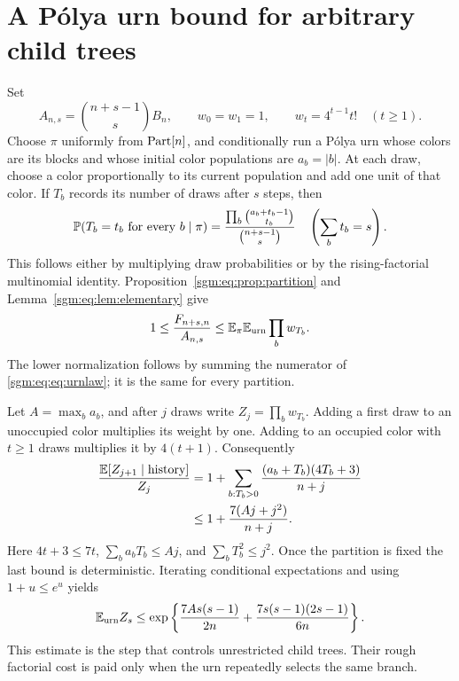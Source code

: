 \documentclass[11pt,letterpaper]{article}
\theoremstyle{remark}\newtheorem{remark}[theorem]{Remark}
\theoremstyle{definition}\newtheorem{definition}[theorem]{Definition}
\begin{document}
\section{A P\'olya urn bound for arbitrary child trees}\label{sgm:eq:sec:urn}
Set
\[
 A_{n,s}=\binom{n+s-1}{s}B_n,
 \qquad w_0=w_1=1,\qquad w_t=4^{t-1}t!\quad(t\ge1).
\]
Choose $\pi$ uniformly from $\operatorname{Part}[n]$, and conditionally run a P\'olya urn whose colors are its blocks and whose initial color populations are $a_b=|b|$. At each draw, choose a color proportionally to its current population and add one unit of that color. If $T_b$ records its number of draws after $s$ steps, then
\begin{equation}\label{sgm:eq:eq:urnlaw}
 \mathbb P(T_b=t_b\text{ for every }b\mid\pi)
 =\frac{\prod_b\binom{a_b+t_b-1}{t_b}}{\binom{n+s-1}{s}}
 \quad\left(\sum_b t_b=s\right).
\end{equation}
This follows either by multiplying draw probabilities or by the rising-factorial multinomial identity. Proposition~\ref{sgm:eq:prop:partition} and Lemma~\ref{sgm:eq:lem:elementary} give
\begin{equation}\label{sgm:eq:eq:urndom}
 1\le\frac{F_{n+s,n}}{A_{n,s}}
 \le\mathbb E_\pi\mathbb E_{\mathrm{urn}}\prod_b w_{T_b}.
\end{equation}
The lower normalization follows by summing the numerator of \eqref{sgm:eq:eq:urnlaw}; it is the same for every partition.

Let $A=\max_ba_b$, and after $j$ draws write $Z_j=\prod_bw_{T_b}$. Adding a first draw to an unoccupied color multiplies its weight by one. Adding to an occupied color with $t\ge1$ draws multiplies it by $4(t+1)$. Consequently
\begin{align*}
 \frac{\mathbb E[Z_{j+1}\mid\text{history}]}{Z_j}
 &=1+\sum_{b:T_b>0}\frac{(a_b+T_b)(4T_b+3)}{n+j}\\
 &\le1+\frac{7(Aj+j^2)}{n+j}.
\end{align*}
Here $4t+3\le7t$, $\sum_ba_bT_b\le Aj$, and $\sum_bT_b^2\le j^2$. Once the partition is fixed the last bound is deterministic. Iterating conditional expectations and using $1+u\le e^u$ yields
\begin{equation}\label{sgm:eq:eq:Zbound}
 \mathbb E_{\mathrm{urn}}Z_s\le
 \exp\left\{\frac{7As(s-1)}{2n}
       +\frac{7s(s-1)(2s-1)}{6n}\right\}.
\end{equation}
This estimate is the step that controls unrestricted child trees. Their rough factorial cost is paid only when the urn repeatedly selects the same branch.
\end{document}
